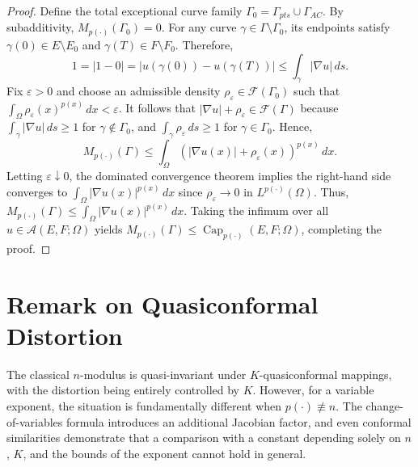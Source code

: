 \documentclass[12pt]{amsart}
\numberwithin{equation}{section}
\theoremstyle{plain}
\theoremstyle{definition}
\begin{document}
\begin{proof}
Define the total exceptional curve family $\Gamma_0 = \Gamma_{pts} \cup \Gamma_{AC}$. By subadditivity, $M_{p(\cdot)}(\Gamma_0) = 0$. For any curve $\gamma \in \Gamma \setminus \Gamma_0$, its endpoints satisfy $\gamma(0) \in E \setminus E_0$ and $\gamma(T) \in F \setminus F_0$. Therefore,
\begin{equation*}
1 = |1 - 0| = |u(\gamma(0)) - u(\gamma(T))| \le \int_\gamma |\nabla u|\,ds.
\end{equation*}
Fix $\varepsilon > 0$ and choose an admissible density $\rho_\varepsilon \in \mathcal{F}(\Gamma_0)$ such that $\int_\Omega \rho_\varepsilon(x)^{p(x)}\,dx < \varepsilon$. It follows that $|\nabla u| + \rho_\varepsilon \in \mathcal{F}(\Gamma)$ because $\int_\gamma |\nabla u|\,ds \ge 1$ for $\gamma \notin \Gamma_0$, and $\int_\gamma \rho_\varepsilon\,ds \ge 1$ for $\gamma \in \Gamma_0$. Hence,
\begin{equation*}
M_{p(\cdot)}(\Gamma) \le \int_\Omega (|\nabla u(x)| + \rho_\varepsilon(x))^{p(x)}\,dx.
\end{equation*}
Letting $\varepsilon \downarrow 0$, the dominated convergence theorem implies the right-hand side converges to $\int_\Omega |\nabla u(x)|^{p(x)}\,dx$ since $\rho_\varepsilon \to 0$ in $L^{p(\cdot)}(\Omega)$. Thus, $M_{p(\cdot)}(\Gamma) \le \int_\Omega |\nabla u(x)|^{p(x)}\,dx$. Taking the infimum over all $u \in \mathcal{A}(E,F;\Omega)$ yields $M_{p(\cdot)}(\Gamma) \le \operatorname{Cap}_{p(\cdot)}(E,F;\Omega)$, completing the proof.
\end{proof}



\section{Remark on Quasiconformal Distortion}

The classical $n$-modulus is quasi-invariant under $K$-quasiconformal mappings, with the distortion being entirely controlled by $K$. However, for a variable exponent, the situation is fundamentally different when $p(\cdot)\not\equiv n$. The change-of-variables formula introduces an additional Jacobian factor, and even conformal similarities demonstrate that a comparison with a constant depending solely on $n$, $K$, and the bounds of the exponent cannot hold in general.
\end{document}
